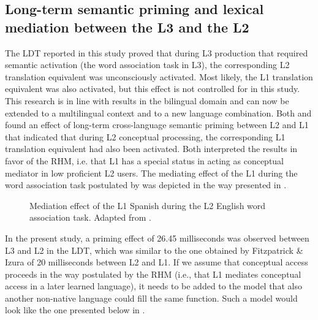 \documentclass[output=paper,colorlinks,citecolor=brown,nonflat]{langsci/langscibook}
\begin{document}
\subsection{Long-term semantic priming and lexical mediation between the L3 and the L2}\label{sec:gudmundson:4.2}\largerpage

The LDT reported in this study proved that during L3 production that required semantic activation (the word association task in L3), the corresponding L2 translation equivalent was unconsciously activated. Most likely, the L1 translation equivalent was also activated, but this effect is not controlled for in this study. This research is in line with results in the bilingual domain and can now be extended to a multilingual context and to a new language combination. Both \citet{FitzpatrickIzura2011} and \citet{LiEtAl2009} found an effect of long-term cross-language semantic priming between L2 and L1 that indicated that during L2 conceptual processing, the corresponding L1 translation equivalent had also been activated. Both interpreted the results in favor of the RHM, i.e. that L1 has a special status in acting as conceptual mediator in low proficient L2 users. The mediating effect of the L1 during the word association task postulated by \citet{FitzpatrickIzura2011} was depicted in the way presented in .

\begin{figure}
    \caption{Mediation effect of the L1 Spanish during the L2 English word association task. Adapted from \citet{FitzpatrickIzura2011}.}
    \label{fig:gudmundson:6}
\end{figure}

In the present study, a priming effect of 26.45 milliseconds was observed between L3 and L2 in the LDT, which was similar to the one obtained by Fitzpatrick \& Izura of 20 milliseconds between L2 and L1. If we assume that conceptual access proceeds in the way postulated by the RHM (i.e., that L1 mediates conceptual access in a later learned language), it needs to be added to the model that also another non-native language could fill the same function. Such a model would look like the one presented below in .
\end{document}
